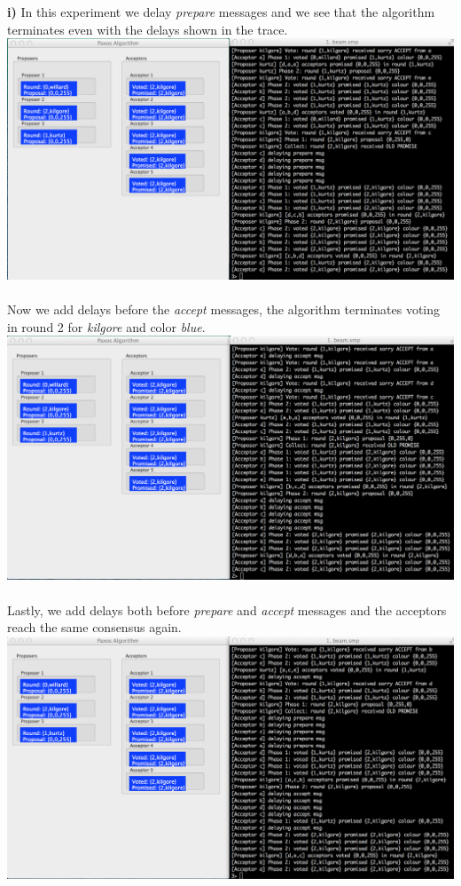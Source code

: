 \documentclass[a4paper, 11pt]{article}
\begin{document}
\textbf{i)} In this experiment we delay \textit{prepare} messages and we see that the algorithm terminates even with the delays shown in the trace.\\
\includegraphics[scale=0.35]{images/exp1.png} \\\\
Now we add delays before the \textit{accept} messages, the algorithm terminates voting in round 2 for \textit{kilgore} and color \textit{blue}.\\
\includegraphics[scale=0.35]{images/exp2.png} \\\\
Lastly, we add delays both before \textit{prepare} and \textit{accept} messages and the acceptors reach the same consensus again.\\
\includegraphics[scale=0.35]{images/exp3.png} \\\\
\end{document}
